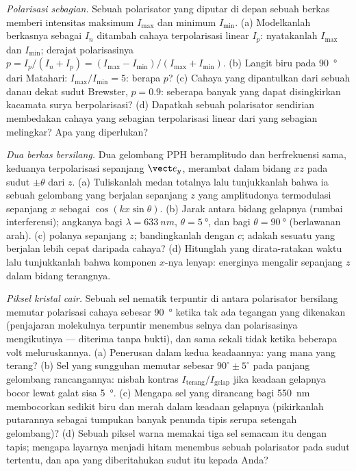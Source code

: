 \begin{exercise}[$\star\star$]\label{exo:b2:plane-waves-polarization:9}
\emph{Polarisasi sebagian.} Sebuah polarisator yang diputar di depan sebuah berkas
memberi intensitas maksimum $I_{\max}$ dan minimum $I_{\min}$. (a) Modelkanlah
berkasnya sebagai  $I_n$ ditambah cahaya terpolarisasi linear $I_p$: nyatakanlah
$I_{\max}$ dan $I_{\min}$; derajat polarisasinya $p = I_p/(I_n + I_p) =
(I_{\max} - I_{\min})/(I_{\max} + I_{\min})$. (b) Langit biru pada \qty{90}{\degree} dari
Matahari: $I_{\max}/I_{\min} = 5$: berapa $p$? (c) Cahaya yang dipantulkan dari sebuah danau dekat
sudut Brewster, $p = 0.9$: seberapa banyak yang dapat disingkirkan kacamata surya berpolarisasi?
(d) Dapatkah sebuah polarisator sendirian membedakan cahaya yang sebagian terpolarisasi
linear dari yang sebagian melingkar? Apa yang diperlukan?
\end{exercise}

\begin{exercise}[$\star\star\star$]\label{exo:b2:plane-waves-polarization:10}
\emph{Dua berkas bersilang.} Dua gelombang PPH beramplitudo dan berfrekuensi
sama, keduanya terpolarisasi sepanjang $\vect e_y$, merambat dalam bidang $xz$
pada sudut $\pm\theta$ dari $z$. (a) Tuliskanlah medan totalnya lalu tunjukkanlah bahwa ia sebuah
gelombang yang berjalan sepanjang $z$ yang amplitudonya termodulasi sepanjang $x$ sebagai
$\cos(kx\sin\theta)$. (b) Jarak antara bidang gelapnya (rumbai
interferensi); angkanya bagi $\lambda = \qty{633}{nm}$, $\theta = \qty{5}{\degree}$, dan bagi
$\theta = \qty{90}{\degree}$ (berlawanan arah). (c) 
polanya sepanjang $z$; bandingkanlah dengan $c$; adakah sesuatu yang berjalan lebih cepat daripada
cahaya? (d) Hitunglah  yang dirata-ratakan waktu lalu tunjukkanlah bahwa
komponen $x$-nya lenyap: energinya mengalir sepanjang $z$ dalam bidang
terangnya.
\end{exercise}

\begin{exercise}[$\star\star\star$]\label{exo:b2:plane-waves-polarization:11}
\emph{Piksel kristal cair.} Sebuah sel nematik terpuntir di antara
polarisator bersilang memutar polarisasi cahaya sebesar \qty{90}{\degree}
ketika tak ada tegangan yang dikenakan (penjajaran molekulnya terpuntir menembus
selnya dan polarisasinya mengikutinya --- diterima tanpa bukti), dan sama sekali tidak
ketika beberapa volt meluruskannya. (a) Penerusan dalam kedua keadaannya: yang
mana yang terang? (b) Sel yang sungguhan memutar sebesar $90^\circ \pm 5^\circ$ pada panjang gelombang
rancangannya: nisbah kontras $I_{\text{terang}}/I_{\text{gelap}}$ jika keadaan
gelapnya bocor lewat galat sisa \qty{5}{\degree}. (c) Mengapa sel yang
dirancang bagi \qty{550}{nm} membocorkan sedikit biru dan merah dalam keadaan gelapnya
(pikirkanlah putarannya sebagai tumpukan banyak penunda tipis serupa
setengah gelombang)? (d) Sebuah piksel warna memakai tiga sel semacam itu dengan tapis; mengapa
layarnya menjadi hitam menembus sebuah polarisator pada sudut tertentu, dan apa
yang diberitahukan sudut itu kepada Anda?
\end{exercise}

